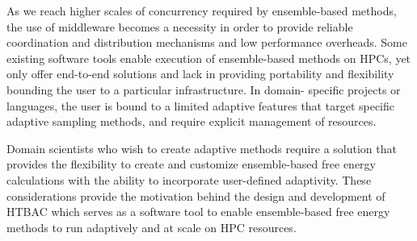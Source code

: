As we reach higher scales of concurrency required by ensemble-based methods,
the use of middleware becomes a necessity in order to provide reliable
coordination and distribution mechanisms and low performance overheads. Some 
existing software tools enable execution of ensemble-based methods on HPCs, 
yet only offer end-to-end solutions and lack in providing portability and 
flexibility bounding the user to a particular infrastructure. In domain-
specific projects or languages, the user is bound to a limited 
adaptive features that target specific adaptive sampling methods, and require 
explicit management of resources.

Domain scientists who wish to create adaptive methods require a solution that 
provides the flexibility to create and customize ensemble-based free energy 
calculations with the ability to incorporate user-defined adaptivity. These 
considerations provide the motivation behind the design and development of
HTBAC which serves as a software tool to enable ensemble-based free energy 
methods to run adaptively and at scale on HPC resources. 









